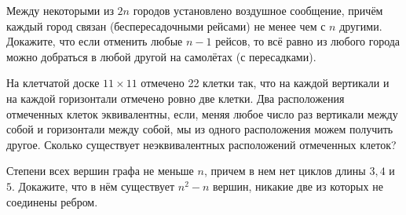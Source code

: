 \documentclass{article}
\begin{document}
\begin{enumerate_boxed}
        \item Между некоторыми из $2n$ городов установлено воздушное сообщение, причём каждый город связан (беспересадочными рейсами) не менее чем с $n$ другими.
        Докажите, что если отменить любые $n - 1$ рейсов, то всё равно из любого города можно добраться в любой другой на самолётах (с пересадками).

        \item На клетчатой доске $11 \times 11$ отмечено 22 клетки так, что на каждой вертикали и на каждой горизонтали отмечено ровно две клетки.
        Два расположения отмеченных клеток эквивалентны, если, меняя любое число раз вертикали между собой и горизонтали между собой, мы из одного расположения можем получить другое.
        Сколько существует неэквивалентных расположений отмеченных клеток?

        \item Степени всех вершин графа не меньше $n$, причем в нем нет циклов длины $3, 4$ и $5$.
        Докажите, что в нём существует $n^2 - n$ вершин, никакие две из которых не соединены ребром.

    \end{enumerate_boxed}
\end{document}
